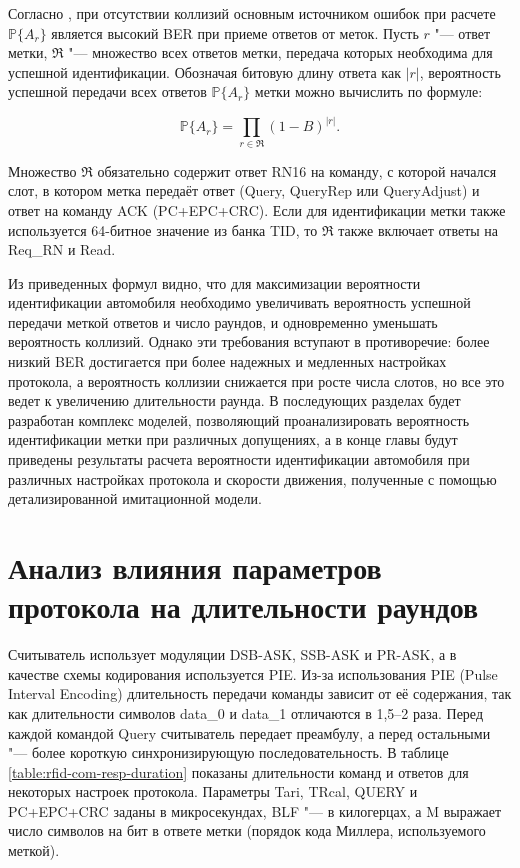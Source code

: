 Согласно \cite{Nikitin2008}, при отсутствии коллизий основным источником ошибок при расчете $\mathbb{P}\{A_r\}$ является высокий BER при приеме ответов от меток. Пусть $r$ "--- ответ метки, $\mathfrak{R}$ "--- множество всех ответов метки, передача которых необходима для успешной идентификации. Обозначая битовую длину ответа как $|r|$, вероятность успешной передачи всех ответов $\mathbb{P}\{A_r\}$ метки можно вычислить по формуле:

$$
	\mathbb{P}\{A_r\}=\prod_{r \in \mathfrak{R}}(1-B)^{|r|}.
$$

Множество $\mathfrak{R}$ обязательно содержит ответ RN16 на команду, с которой начался слот, в котором метка передаёт ответ (Query, QueryRep или QueryAdjust) и ответ на команду ACK (PC+EPC+CRC). Если для идентификации метки также используется 64-битное значение из банка TID, то $\mathfrak{R}$ также включает ответы на Req\_RN и Read.

Из приведенных формул видно, что для максимизации вероятности идентификации автомобиля необходимо увеличивать вероятность успешной передачи меткой ответов и число раундов, и одновременно уменьшать вероятность коллизий. Однако эти требования вступают в противоречие: более низкий BER достигается при более надежных и медленных настройках протокола, а вероятность коллизии снижается при росте числа слотов, но все это ведет к увеличению длительности раунда. В последующих разделах будет разработан комплекс моделей, позволяющий проанализировать вероятность идентификации метки при различных допущениях, а в конце главы будут приведены результаты расчета вероятности идентификации автомобиля при различных настройках протокола и скорости движения, полученные с помощью детализированной имитационной модели.







\section{Анализ влияния параметров протокола на длительности раундов}\label{sec:ch2_durations}
Считыватель использует модуляции DSB-ASK, SSB-ASK и PR-ASK, а в качестве схемы кодирования используется PIE. Из-за использования PIE (Pulse Interval Encoding) длительность передачи команды зависит от её содержания, так как длительности символов data\_0 и data\_1 отличаются в 1,5--2 раза. Перед каждой командой Query считыватель передает преамбулу, а перед остальными "--- более короткую синхронизирующую последовательность. В таблице \ref{table:rfid-com-resp-duration} показаны длительности команд и ответов для некоторых настроек протокола. Параметры Tari, TRcal, QUERY и PC+EPC+CRC заданы в микросекундах, BLF "--- в килогерцах, а M выражает число символов на бит в ответе метки (порядок кода Миллера, используемого меткой).

